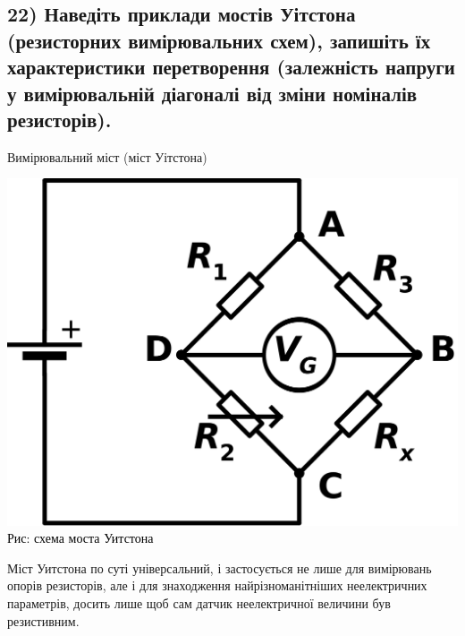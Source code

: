 \documentclass{beamer}
\begin{document}
\begin{frame}
  \section
  {22) \small{Наведіть приклади мостів Уітстона (резисторних вимірювальних схем), запишіть їх характеристики перетворення (залежність напруги у вимірювальній діагоналі від зміни номіналів резисторів).
 }}
\end{frame}


\begin{frame}{Вимірювальний  міст (міст Уітстона)}
\begin{center}
\includegraphics[scale=0.08]{most.png}\\ \textcolor{black}{Рис: схема моста Уитстона}\\
\end{center}
Міст Уитстона по суті універсальний, і застосується не лише для вимірювань опорів резисторів, але і для знаходження найрізноманітніших неелектричних параметрів, досить лише щоб сам датчик неелектричної величини був резистивним.
  \end{frame}
\end{document}
